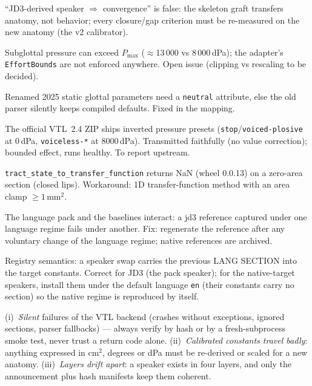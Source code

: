 \documentclass[11pt,a4paper]{article}
\newcommand{\code}[1]{\texttt{#1}}
\begin{document}
\begin{description}[leftmargin=2.8em, itemsep=3pt, style=nextline]
\item[D15 ---] ``JD3-derived speaker $\Rightarrow$ convergence'' is false: the skeleton graft transfers anatomy, not behavior; every closure/gap criterion must be re-measured on the new anatomy (the v2 calibrator).
\item[D16 ---] Subglottal pressure can exceed $P_{\max}$ ($\approx$13\,000 vs 8\,000\,dPa); the adapter's \code{EffortBounds} are not enforced anywhere. Open issue (clipping vs rescaling to be decided).
\item[D17 ---] Renamed 2025 static glottal parameters need a \code{neutral} attribute, else the old parser silently keeps compiled defaults. Fixed in the mapping.
\item[D18 ---] The official VTL~2.4 ZIP ships inverted pressure presets (\code{stop}/\code{voiced-plosive} at 0\,dPa, \code{voiceless-*} at 8000\,dPa). Transmitted faithfully (no value correction); bounded effect, runs healthy. To report upstream.
\item[D19 ---] \code{tract\_state\_to\_transfer\_function} returns NaN (wheel 0.0.13) on a zero-area section (closed lips). Workaround: 1D transfer-function method with an area clamp $\ge 1$\,mm$^2$.
\item[D20 ---] The language pack and the baselines interact: a jd3 reference captured under one language regime fails under another. Fix: regenerate the reference after any voluntary change of the language regime; native references are archived.
\item[D21 ---] Registry semantics: a speaker swap carries the previous LANG SECTION into the target constants. Correct for JD3 (the pack speaker); for the native-target speakers, install them under the default language \code{en} (their constants carry no section) so the native regime is reproduced by itself.
\end{description}

\begin{callout}
(i)~\emph{Silent} failures of the VTL backend (crashes without
exceptions, ignored sections, parser fallbacks) --- always verify by
hash or by a fresh-subprocess smoke test, never trust a return code
alone. (ii)~\emph{Calibrated constants travel badly}: anything
expressed in cm$^2$, degrees or dPa must be re-derived or scaled for
a new anatomy. (iii)~\emph{Layers drift apart}: a speaker exists in
four layers, and only the announcement plus hash manifests keep them
coherent.
\end{callout}
\end{document}
